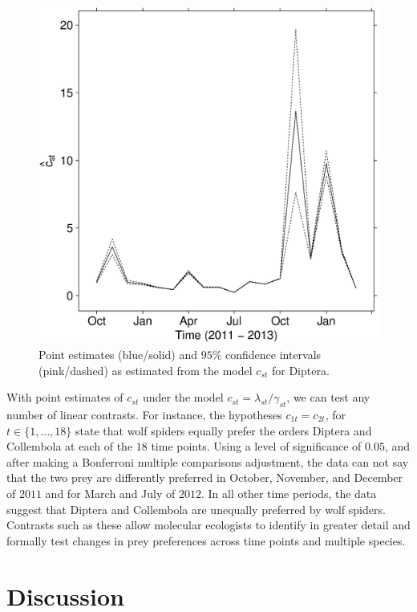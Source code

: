 \documentclass[smallextended]{svjour3}
\begin{document}
\begin{figure}
  \centering
  \includegraphics[scale=0.35]{est_dipt}
  \caption{Point estimates (blue/solid) and $95\%$ confidence intervals (pink/dashed) as estimated from the model $c_{st}$ for Diptera.}
  \label{fig:est_dipt}
\end{figure}

With point estimates of $c_{st}$ under the model $c_{st} = \lambda_{st}/\gamma_{st}$, we can test any number of linear contrasts.  For instance, the hypotheses $c_{1t} = c_{2t}$, for $t \in \{1, \ldots, 18\}$ state that wolf spiders equally prefer the orders Diptera and Collembola at each of the $18$ time points.  Using a level of significance of $0.05$, and after making a Bonferroni multiple comparisons adjustment, the data can not say that the two prey are differently preferred in October, November, and December of $2011$ and for March and July of $2012$.  In all other time periods, the data suggest that Diptera and Collembola are unequally preferred by wolf spiders.  Contrasts such as these allow molecular ecologists to identify in greater detail and formally test changes in prey preferences across time points and multiple species.

\section{Discussion}
\label{sec:discussion}
\end{document}
